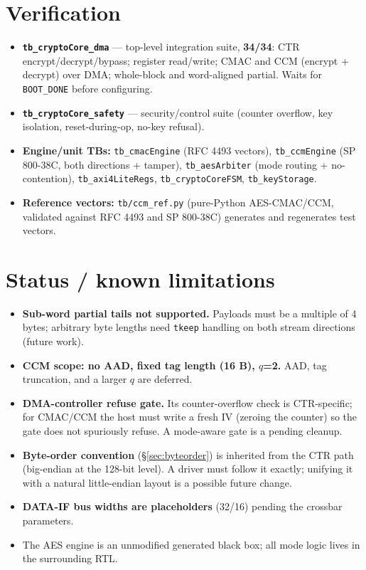 \documentclass[11pt,a4paper]{article}
\newcommand{\bit}[1]{\texttt{#1}}
\begin{document}
\section{Verification}
\begin{itemize}[nosep]
  \item \textbf{\texttt{tb\_cryptoCore\_dma}} --- top-level integration suite, \textbf{34/34}:
        CTR encrypt/decrypt/bypass; register read/write; CMAC and CCM (encrypt + decrypt) over
        DMA; whole-block and word-aligned partial. Waits for \bit{BOOT\_DONE} before configuring.
  \item \textbf{\texttt{tb\_cryptoCore\_safety}} --- security/control suite (counter overflow,
        key isolation, reset-during-op, no-key refusal).
  \item \textbf{Engine/unit TBs:} \texttt{tb\_cmacEngine} (RFC 4493 vectors),
        \texttt{tb\_ccmEngine} (SP 800-38C, both directions + tamper), \texttt{tb\_aesArbiter}
        (mode routing + no-contention), \texttt{tb\_axi4LiteRegs}, \texttt{tb\_cryptoCoreFSM},
        \texttt{tb\_keyStorage}.
  \item \textbf{Reference vectors:} \texttt{tb/ccm\_ref.py} (pure-Python AES-CMAC/CCM, validated
        against RFC 4493 and SP 800-38C) generates and regenerates test vectors.
\end{itemize}

\section{Status / known limitations}\label{sec:limits}
\begin{itemize}[nosep]
  \item \textbf{Sub-word partial tails not supported.} Payloads must be a multiple of 4 bytes;
        arbitrary byte lengths need \texttt{tkeep} handling on both stream directions (future work).
  \item \textbf{CCM scope: no AAD, fixed tag length (16 B), \(q\)=2.} AAD, tag truncation, and a
        larger \(q\) are deferred.
  \item \textbf{DMA-controller refuse gate.} Its counter-overflow check is CTR-specific; for
        CMAC/CCM the host must write a fresh IV (zeroing the counter) so the gate does not
        spuriously refuse. A mode-aware gate is a pending cleanup.
  \item \textbf{Byte-order convention} (\S\ref{sec:byteorder}) is inherited from the CTR path
        (big-endian at the 128-bit level). A driver must follow it exactly; unifying it with a
        natural little-endian layout is a possible future change.
  \item \textbf{DATA-IF bus widths are placeholders} (32/16) pending the crossbar parameters.
  \item The AES engine is an unmodified generated black box; all mode logic lives in the
        surrounding RTL.
\end{itemize}
\end{document}
